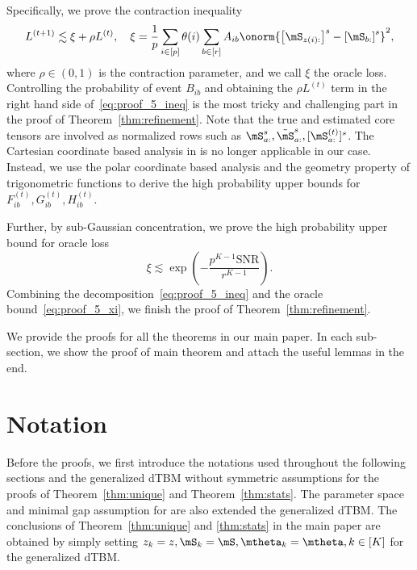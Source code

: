 \documentclass[lettersize,onecolumn,journal]{IEEEtran}
\theoremstyle{definition}
\theoremstyle{definition}
\newcommand{\of}[1]{\left(#1\right)}
\newcommand{\off}[1]{\left[#1\right]}
\begin{document}
{Specifically, we prove the contraction inequality
\begin{equation}\label{eq:proof_5_ineq}
    L^{(t+1)} \lesssim \xi + \rho L^{(t)}, \quad \xi = \frac{1}{p}  \sum_{i \in [p]} \theta(i) \sum_{b \in [r]}  A_{ib} \onorm{ \off{ \mS_{ z(i):}  }^s - \off{ \mS_{b:}  }^s  }^2,
\end{equation}
where $\rho \in (0,1)$ is the contraction parameter, and we call $\xi$ the oracle loss. Controlling the probability of event $B_{ib}$ and obtaining the $\rho L^{(t)}$ term in the right hand side of~\eqref{eq:proof_5_ineq} is the most tricky and challenging part in the proof of Theorem~\ref{thm:refinement}. Note that the true and estimated core tensors are involved as normalized rows such as $\mS_{a:}^s, \tilde \mS_{a:}^s, [\mS^{(t)}_{a:}]^s$. The Cartesian coordinate based analysis in \cite{han2020exact} is no longer applicable in our case. Instead, we use the polar coordinate based analysis and the geometry property of trigonometric functions to derive the high probability upper bounds for $F_{ib}^{(t)}, G_{ib}^{(t)}, H_{ib}^{(t)}$. 

Further, by sub-Gaussian concentration, we prove the high probability upper bound for oracle loss
\begin{equation}\label{eq:proof_5_xi}
    \xi  \lesssim \exp\of{- \frac{p^{K-1}\text{SNR}}{r^{K-1}}}.
\end{equation}
Combining the decomposition~\eqref{eq:proof_5_ineq} and the oracle bound~\eqref{eq:proof_5_xi}, we finish the proof of Theorem~\ref{thm:refinement}.

}





\newpage
\appendix


We provide the proofs for all the theorems in our main paper. In each sub-section, we show the proof of main theorem and attach the useful lemmas in the end.

\section*{Notation}
Before the proofs, we first introduce the notations used throughout the following sections and the generalized dTBM without symmetric assumptions for the proofs of Theorem~\ref{thm:unique} and Theorem~\ref{thm:stats}. The parameter space and minimal gap assumption for are also extended the generalized dTBM. The conclusions of Theorem~\ref{thm:unique} and \ref{thm:stats} in the main paper are obtained by simply setting $z_k = z, \mS_k = \mS, \mtheta_k = \mtheta, k \in [K]$ for the generalized dTBM.
\end{document}

